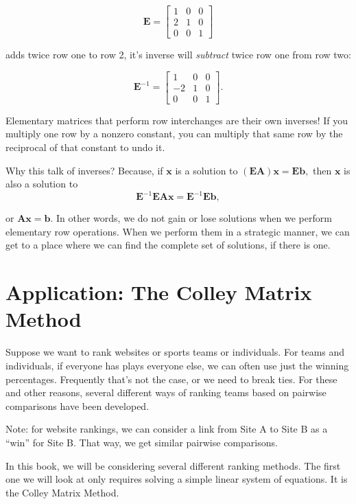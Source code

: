 \documentclass[
]{book}
\theoremstyle{definition}
\theoremstyle{definition}
\theoremstyle{definition}
\theoremstyle{definition}
\theoremstyle{remark}
\begin{document}
\[\mathbf{E}=\begin{bmatrix} 1 & 0 & 0\\2 & 1 & 0\\0 & 0 & 1\end{bmatrix}\]

adds twice row one to row 2, it's inverse will \emph{subtract} twice row one from row two:

\[\mathbf{E}^{-1}=\begin{bmatrix} 1 & 0 & 0\\-2 & 1 & 0\\0 & 0 & 1\end{bmatrix}.\]

Elementary matrices that perform row interchanges are their own inverses! If you multiply one row by a nonzero constant, you can multiply that same row by the reciprocal of that constant to undo it.

Why this talk of inverses? Because, if \(\mathbf{x}\) is a solution to \((\mathbf{E}\mathbf{A})\mathbf{x}=\mathbf{E}\mathbf{b},\) then \(\mathbf{x}\) is also a solution to
\[\mathbf{E}^{-1}\mathbf{E}\mathbf{A}\mathbf{x}=\mathbf{E}^{-1}\mathbf{E}\mathbf{b},\]

or \(\mathbf{A}\mathbf{x}=\mathbf{b}.\) In other words, we do not gain or lose solutions when we perform elementary row operations.
When we perform them in a strategic manner, we can get to a place where we can find the complete set of solutions, if there is one.

\section{Application: The Colley Matrix Method}\label{Colley}

Suppose we want to rank websites or sports teams or individuals. For teams and individuals, if everyone has plays everyone else, we can often use just the winning percentages. Frequently that's not the case, or we need to break ties. For these and other reasons, several different ways of ranking teams based on pairwise comparisons have been developed.

\begin{notebox}
Note: for website rankings, we can consider a link from Site A to Site B as a ``win'' for Site B. That way, we get similar pairwise comparisons.

\end{notebox}

In this book, we will be considering several different ranking methods. The first one we will look at only requires solving a simple linear system of equations. It is the Colley Matrix Method.
\end{document}
